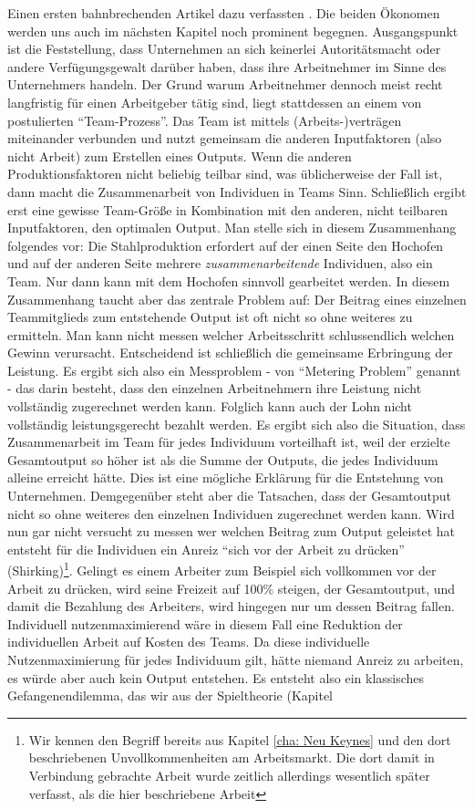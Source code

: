 Einen ersten bahnbrechenden Artikel dazu verfassten \textcite{Alchian1972}. Die beiden Ökonomen werden uns auch im nächsten Kapitel noch prominent begegnen. Ausgangspunkt ist die Feststellung, dass Unternehmen an sich keinerlei Autoritätsmacht oder andere Verfügungsgewalt darüber haben, dass ihre Arbeitnehmer im Sinne des Unternehmers handeln. Der Grund warum Arbeitnehmer dennoch meist recht langfristig für einen Arbeitgeber tätig sind, liegt stattdessen an einem von \textcite[S. 778]{Alchian1972} postulierten "`Team-Prozess"'. Das Team ist mittels (Arbeits-)verträgen miteinander verbunden und nutzt gemeinsam die anderen Inputfaktoren (also nicht Arbeit) zum Erstellen eines Outputs. Wenn die anderen Produktionsfaktoren nicht beliebig teilbar sind, was üblicherweise der Fall ist, dann macht die Zusammenarbeit von Individuen in Teams Sinn. Schließlich ergibt erst eine gewisse Team-Größe in Kombination mit den anderen, nicht teilbaren Inputfaktoren, den optimalen Output. Man stelle sich in diesem Zusammenhang folgendes vor: Die Stahlproduktion erfordert auf der einen Seite den Hochofen und auf der anderen Seite mehrere \textit{zusammenarbeitende} Individuen, also ein Team. Nur dann kann mit dem Hochofen sinnvoll gearbeitet werden. In diesem Zusammenhang taucht aber das zentrale Problem auf: Der Beitrag eines einzelnen Teammitglieds zum entstehende Output ist oft nicht so ohne weiteres zu ermitteln. Man kann nicht messen welcher Arbeitsschritt schlussendlich welchen Gewinn verursacht. Entscheidend ist schließlich die gemeinsame Erbringung der Leistung. Es ergibt sich also ein Messproblem - von \textcite[S. 778]{Alchian1972} "`Metering Problem"' genannt - das darin besteht, dass den einzelnen Arbeitnehmern ihre Leistung nicht vollständig zugerechnet werden kann. Folglich kann auch der Lohn nicht vollständig leistungsgerecht bezahlt werden. Es ergibt sich also die Situation, dass Zusammenarbeit im Team für jedes Individuum vorteilhaft ist, weil der erzielte Gesamtoutput so höher ist als die Summe der Outputs, die jedes Individuum alleine erreicht hätte. Dies ist eine mögliche Erklärung für die Entstehung von Unternehmen. Demgegenüber steht aber die Tatsachen, dass der Gesamtoutput nicht so ohne weiteres den einzelnen Individuen zugerechnet werden kann. Wird nun gar nicht versucht zu messen wer welchen Beitrag zum Output geleistet hat entsteht für die Individuen ein Anreiz "`sich vor der Arbeit zu drücken"' (Shirking)\footnote{Wir kennen den Begriff bereits aus Kapitel \ref{cha: Neu Keynes} und den dort beschriebenen Unvollkommenheiten am Arbeitsmarkt. Die dort damit in Verbindung gebrachte Arbeit \textcite{ShapiroStiglitz1984} wurde zeitlich allerdings wesentlich später verfasst, als die hier beschriebene Arbeit}. Gelingt es einem Arbeiter zum Beispiel sich vollkommen vor der Arbeit zu drücken, wird seine Freizeit auf 100\% steigen, der Gesamtoutput, und damit die Bezahlung des Arbeiters, wird hingegen nur um dessen Beitrag fallen. Individuell nutzenmaximierend wäre in diesem Fall eine Reduktion der individuellen Arbeit auf Kosten des Teams. Da diese individuelle Nutzenmaximierung für jedes Individuum gilt, hätte niemand Anreiz zu arbeiten, es würde aber auch kein Output entstehen. Es entsteht also ein klassisches Gefangenendilemma, das wir aus der Spieltheorie (Kapitel 